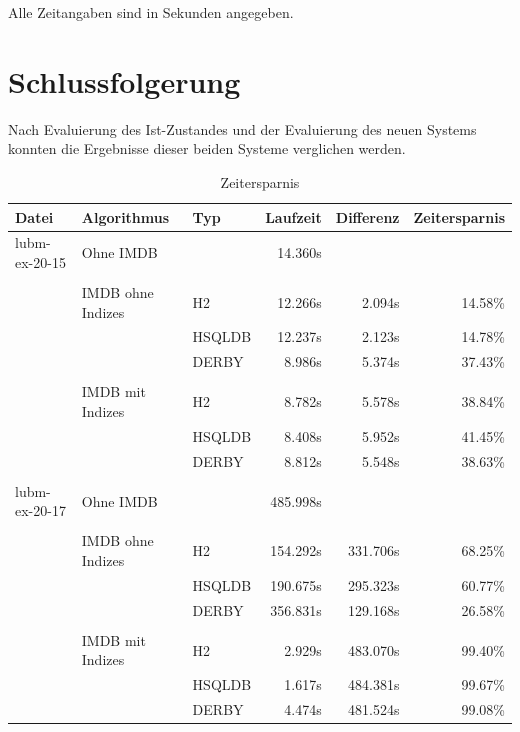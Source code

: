 \documentclass[draft,final]{vutinfth} %
\begin{document}
Alle Zeitangaben sind in Sekunden angegeben.

\chapter{Schlussfolgerung}
Nach Evaluierung des Ist-Zustandes und der Evaluierung des neuen Systems konnten die Ergebnisse dieser beiden Systeme verglichen werden.


\begin{table}[]
\caption{Zeitersparnis}
\label{zeit}
\begin{tabular}{@{}lllrrr@{}}
\toprule
Datei         & Algorithmus       & Typ    & Laufzeit & Differenz & Zeitersparnis \\ \midrule
lubm-ex-20-15 & Ohne IMDB         &        & 14.360s  &           &               \\
              &                   &        &          &           &               \\
              & IMDB ohne Indizes & H2     & 12.266s  & 2.094s    & 14.58\%       \\
              &                   & HSQLDB & 12.237s  & 2.123s    & 14.78\%       \\
              &                   & DERBY  & 8.986s   & 5.374s    & 37.43\%       \\
              &                   &        &          &           &               \\
              & IMDB mit Indizes  & H2     & 8.782s   & 5.578s    & 38.84\%       \\
              &                   & HSQLDB & 8.408s   & 5.952s    & 41.45\%       \\
              &                   & DERBY  & 8.812s   & 5.548s    & 38.63\%       \\
              &                   &        &          &           &               \\
lubm-ex-20-17 & Ohne IMDB         &        & 485.998s &           &               \\
              &                   &        &          &           &               \\
              & IMDB ohne Indizes & H2     & 154.292s & 331.706s  & 68.25\%       \\
              &                   & HSQLDB & 190.675s & 295.323s  & 60.77\%       \\
              &                   & DERBY  & 356.831s & 129.168s  & 26.58\%       \\
              &                   &        &          &           &               \\
              & IMDB mit Indizes  & H2     & 2.929s   & 483.070s  & 99.40\%       \\
              &                   & HSQLDB & 1.617s   & 484.381s  & 99.67\%       \\
              &                   & DERBY  & 4.474s   & 481.524s  & 99.08\%       \\ \bottomrule
\end{tabular}
\end{table}
\end{document}
